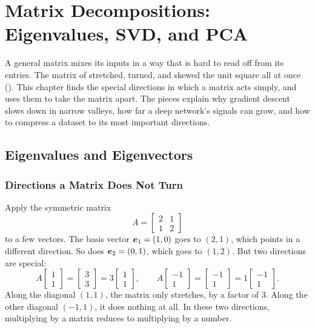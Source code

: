 \chapter{Matrix Decompositions: Eigenvalues, SVD, and PCA}
\label{chap:ch04}


A general matrix mixes its inputs in a way that is hard to read off from
its entries. The matrix of  stretched, turned, and
skewed the unit square all at once (). This
chapter finds the special directions in which a matrix acts simply, and
uses them to take the matrix apart. The pieces explain why gradient
descent slows down in narrow valleys, how far a deep network's signals
can grow, and how to compress a dataset to its most important directions.

\section{Eigenvalues and Eigenvectors}
\label{sec:ch04-eigen}

\subsection{Directions a Matrix Does Not Turn}
\label{sec:ch04-eigen-def}

Apply the symmetric matrix
\[
  A = \begin{bmatrix} 2 & 1 \\ 1 & 2 \end{bmatrix}
\]
to a few vectors. The basis vector $\bm{e}_1 = (1, 0)$ goes to
$(2, 1)$, which points in a different direction. So does
$\bm{e}_2 = (0, 1)$, which goes to $(1, 2)$. But two directions are
special:
\[
  A \begin{bmatrix} 1 \\ 1 \end{bmatrix}
  = \begin{bmatrix} 3 \\ 3 \end{bmatrix}
  = 3 \begin{bmatrix} 1 \\ 1 \end{bmatrix},
  \qquad
  A \begin{bmatrix} -1 \\ 1 \end{bmatrix}
  = \begin{bmatrix} -1 \\ 1 \end{bmatrix}
  = 1 \begin{bmatrix} -1 \\ 1 \end{bmatrix}.
\]
Along the diagonal $(1, 1)$, the matrix only stretches, by a factor of
$3$. Along the other diagonal $(-1, 1)$, it does nothing at all. In these
two directions, multiplying by a matrix reduces to multiplying by a
number.


